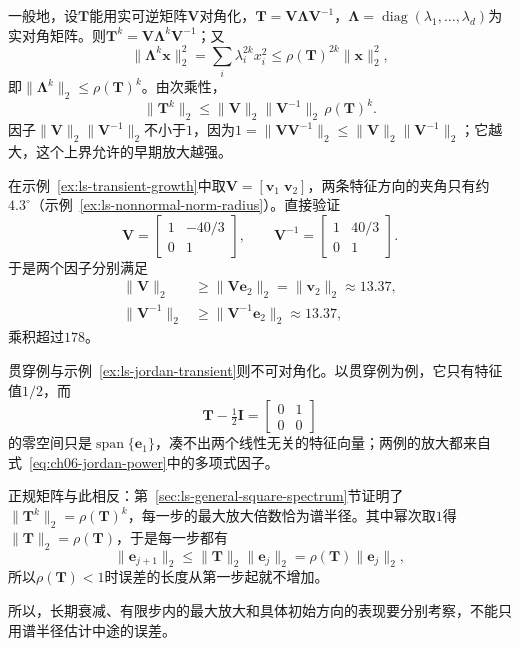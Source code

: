 一般地，设$\bm T$能用实可逆矩阵$\bm V$对角化，$\bm T=\bm V\bm\Lambda\bm V^{-1}$，$\bm\Lambda=\operatorname{diag}(\lambda_1,\ldots,\lambda_d)$为实对角矩阵。则$\bm T^k=\bm V\bm\Lambda^k\bm V^{-1}$；又
\[
 \lVert\bm\Lambda^k\bm x\rVert_2^2=\sum_i\lambda_i^{2k}x_i^2\leq\rho(\bm T)^{2k}\lVert\bm x\rVert_2^2 ,
\]
即$\lVert\bm\Lambda^k\rVert_2\leq\rho(\bm T)^k$。由次乘性，
\[
 \lVert\bm T^k\rVert_2\leq\lVert\bm V\rVert_2\lVert\bm V^{-1}\rVert_2\,\rho(\bm T)^k .
\]
因子$\lVert\bm V\rVert_2\lVert\bm V^{-1}\rVert_2$不小于$1$，因为$1=\lVert\bm V\bm V^{-1}\rVert_2\leq\lVert\bm V\rVert_2\lVert\bm V^{-1}\rVert_2$；它越大，这个上界允许的早期放大越强。

在示例~\ref{ex:ls-transient-growth}中取$\bm V=[\bm v_1\;\bm v_2]$，两条特征方向的夹角只有约$4.3^\circ$（示例~\ref{ex:ls-nonnormal-norm-radius}）。直接验证
\[
 \bm V=\begin{bmatrix}1&-40/3\\0&1\end{bmatrix},\qquad
 \bm V^{-1}=\begin{bmatrix}1&40/3\\0&1\end{bmatrix}.
\]
于是两个因子分别满足
\[
 \begin{aligned}
 \lVert\bm V\rVert_2&\geq\lVert\bm V\bm e_2\rVert_2=\lVert\bm v_2\rVert_2\approx13.37,\\
 \lVert\bm V^{-1}\rVert_2&\geq\lVert\bm V^{-1}\bm e_2\rVert_2\approx13.37 ,
 \end{aligned}
\]
乘积超过$178$。

贯穿例与示例~\ref{ex:ls-jordan-transient}则不可对角化。以贯穿例为例，它只有特征值$1/2$，而
\[
 \bm T-\tfrac12\bm I=\begin{bmatrix}0&1\\0&0\end{bmatrix}
\]
的零空间只是$\operatorname{span}\{\bm e_1\}$，凑不出两个线性无关的特征向量；两例的放大都来自式~\eqref{eq:ch06-jordan-power}中的多项式因子。

正规矩阵与此相反：第~\ref{sec:ls-general-square-spectrum}节证明了$\lVert\bm T^k\rVert_2=\rho(\bm T)^k$，每一步的最大放大倍数恰为谱半径。其中幂次取$1$得$\lVert\bm T\rVert_2=\rho(\bm T)$，于是每一步都有
\[
 \lVert\bm e_{j+1}\rVert_2\leq\lVert\bm T\rVert_2\lVert\bm e_j\rVert_2=\rho(\bm T)\lVert\bm e_j\rVert_2 ,
\]
所以$\rho(\bm T)<1$时误差的长度从第一步起就不增加。

所以，长期衰减、有限步内的最大放大和具体初始方向的表现要分别考察，不能只用谱半径估计中途的误差。


